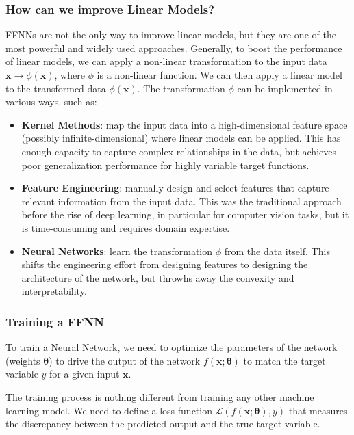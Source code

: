 \subsubsection{How can we improve Linear Models?}
FFNNs are not the only way to improve linear models, but they are one of the most powerful and widely used approaches.
Generally, to boost the performance of linear models, we can apply a non-linear transformation to the input data $\boldsymbol{x} \rightarrow \phi(\boldsymbol{x})$, where $\phi$ is a non-linear function.
We can then apply a linear model to the transformed data $\phi(\boldsymbol{x})$. 
The transformation $\phi$ can be implemented in various ways, such as:
\begin{itemize}
    \item \textbf{Kernel Methods}: map the input data into a high-dimensional feature space (possibly infinite-dimensional) where linear models can be applied.
    This has enough capacity to capture complex relationships in the data, but achieves poor generalization performance for highly variable target functions.
    \item \textbf{Feature Engineering}: manually design and select features that capture relevant information from the input data.
    This was the traditional approach before the rise of deep learning, in particular for computer vision tasks, but it is time-consuming and requires domain expertise.
    \item \textbf{Neural Networks}: learn the transformation $\phi$ from the data itself. This shifts the engineering effort from designing features to designing the architecture of the network,
    but throwhs away the convexity and interpretability. 
\end{itemize}

\subsubsection{Training a FFNN}
To train a Neural Network, we need to optimize the parameters of the network (weights $\boldsymbol{\theta}$) to drive the output of the network $f(\boldsymbol{x}; \boldsymbol{\theta})$
to match the target variable $y$ for a given input $\boldsymbol{x}$.

The training process is nothing different from training any other machine learning model.
We need to define a loss function $\mathcal{L}(f(\boldsymbol{x}; \boldsymbol{\theta}), y)$ that measures the discrepancy between the predicted output and the true target variable.

